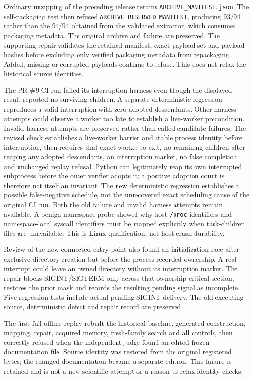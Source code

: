\documentclass[
  10pt,
]{article}
\begin{document}
Ordinary unzipping of the preceding release retains
\texttt{ARCHIVE\_MANIFEST.json}. The self-packaging test then refused
\texttt{ARCHIVE\_RESERVED\_MANIFEST}, producing 93/94 rather than the
94/94 obtained from the validated extractor, which consumes packaging
metadata. The original archive and failure are preserved. The supporting
repair validates the retained manifest, exact payload set and payload
hashes before excluding only verified packaging metadata from
repackaging. Added, missing or corrupted payloads continue to refuse.
This does not relax the historical source identities.

The PR \#9 CI run failed its interruption harness even though the
displayed result reported no surviving children. A separate
deterministic regression reproduces a valid interruption with zero
adopted descendants. Other harness attempts could observe a worker too
late to establish a live-worker precondition. Invalid harness attempts
are preserved rather than called candidate failures. The revised check
establishes a live-worker barrier and stable process identity before
interruption, then requires that exact worker to exit, no remaining
children after reaping any adopted descendants, an interruption marker,
no false completion and unchanged replay refusal. Python can
legitimately reap its own interrupted subprocess before the outer
verifier adopts it; a positive adoption count is therefore not itself an
invariant. The new deterministic regression establishes a possible
false-negative schedule, not the unrecovered exact scheduling cause of
the original CI run. Both the old failure and invalid harness attempts
remain available. A benign namespace probe showed why host
\texttt{/proc} identifiers and namespace-local syscall identifiers must
be mapped explicitly when task-children files are unavailable. This is
Linux qualification, not host-crash durability.

Review of the new connected entry point also found an initialization
race after exclusive directory creation but before the process recorded
ownership. A real interrupt could leave an owned directory without its
interruption marker. The repair blocks SIGINT/SIGTERM only across that
ownership-critical section, restores the prior mask and records the
resulting pending signal as incomplete. Five regression tests include
actual pending-SIGINT delivery. The old executing source, deterministic
defect and repair record are preserved.

The first full offline replay rebuilt the historical baseline, generated
construction, mapping, repair, acquired memory, fresh-family search and
all controls, then correctly refused when the independent judge found an
edited frozen documentation file. Source identity was restored from the
original registered bytes; the changed documentation became a separate
edition. This failure is retained and is not a new scientific attempt or
a reason to relax identity checks.
\end{document}
